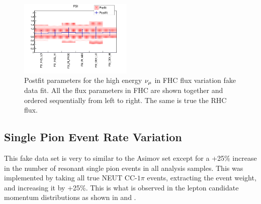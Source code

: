 \begin{figure}
\begin{centering}
{\begin{centering}
\includegraphics[width=0.48\textwidth]{Chapters/Figures/Validation/NuMuFluxVariationFakeData/FSI}
\par\end{centering}
}
\par\end{centering}
\caption[Postfit Parameters for the High Energy Neutrino in FHC Flux Fake Data
fit]{Postfit parameters for the high energy $\protect\nu_{\mu}$ in FHC flux
variation fake data fit. All the flux parameters in FHC are shown
together and ordered sequentially from left to right. The same is
true the RHC flux.\label{fig:Postfit-numu-flux-fake-data}}
\end{figure}


\subsection{Single Pion Event Rate Variation}

This fake data set is very to similar to the Asimov set except for
a +25\% increase in the number of resonant single pion events in all
analysis samples. This was implemented by taking all true NEUT CC-$1\pi$
events, extracting the event weight, and increasing it by +25\%. This
is what is observed in the lepton candidate momentum distributions
as shown in 
and .

